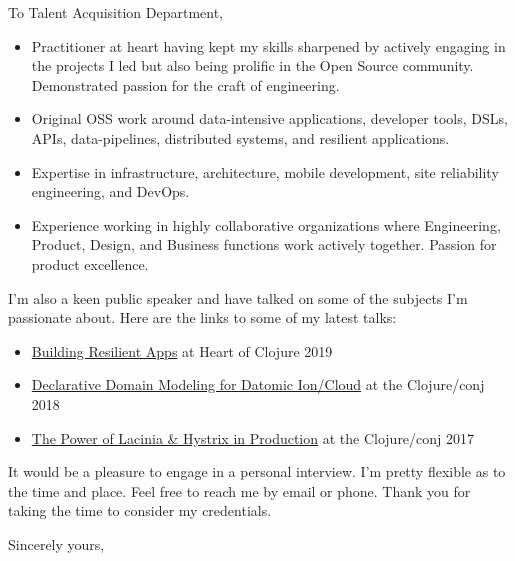 \documentclass{letter} %
\begin{document}
\begin{letter}{To Talent Acquisition Department,}
\begin{itemize}
\item Practitioner at heart having kept my skills sharpened by
  actively engaging in the projects I led but also being prolific in
  the Open Source community. Demonstrated passion for the craft of
  engineering.

\item Original OSS work around data-intensive applications, developer
  tools, DSLs, APIs, data-pipelines, distributed systems, and
  resilient applications.

\item Expertise in infrastructure, architecture, mobile
  development, site reliability engineering, and DevOps.

\item Experience working in highly collaborative organizations where
  Engineering, Product, Design, and Business functions work actively
  together. Passion for product excellence.

\end{itemize}


\noindent I'm also a keen public speaker and have talked on some of
the subjects I'm passionate about. Here are the links to some of my
latest talks:

\begin{itemize}
  \item \href{https://www.youtube.com/watch?v=KtN0vqOlmn8}{Building
    Resilient Apps} at Heart of Clojure 2019
  
  \item \href{https://www.youtube.com/watch?v=EDojA_fahvM}{Declarative
    Domain Modeling for Datomic Ion/Cloud} at the Clojure/conj 2018

  \item \href{https://www.youtube.com/watch?v=uL9QavmAInw}{The Power
    of Lacinia \& Hystrix in Production} at the Clojure/conj 2017
\end{itemize}

\noindent It would be a pleasure to engage in a personal
interview. I’m pretty flexible as to the time and place. Feel free to
reach me by email or phone. Thank you for taking the time to consider
my credentials.

\closing{Sincerely yours,}


\end{letter}
\end{document}
